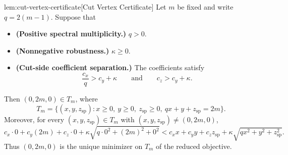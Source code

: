 \documentclass[11pt]{article}
\begin{document}
\begin{lemmav}{lem:cut-vertex-certificate}[Cut Vertex Certificate]
Let \(m\) be fixed and write \(q=2(m-1)\). Suppose that
\begin{itemize}
\item \textbf{(Positive spectral multiplicity.)} \(q>0\).
\item \textbf{(Nonnegative robustness.)} \(\kappa\ge 0\).
\item \textbf{(Cut-side coefficient separation.)} The coefficients satisfy
\[
\frac{c_x}{q}>c_y+\kappa
\qquad\text{and}\qquad
c_z>c_y+\kappa .
\]
\end{itemize}
Then \((0,2m,0)\in T_m\), where
\[
T_m=\{(x,y,z_{\mathrm{sp}}): x\ge 0,\ y\ge 0,\ z_{\mathrm{sp}}\ge 0,\ qx+y+z_{\mathrm{sp}}=2m\}.
\]
Moreover, for every \((x,y,z_{\mathrm{sp}})\in T_m\) with
\((x,y,z_{\mathrm{sp}})\neq (0,2m,0)\),
\[
c_x\cdot 0+c_y(2m)+c_z\cdot 0
+\kappa\sqrt{q\cdot 0^2+(2m)^2+0^2}
<
c_xx+c_yy+c_zz_{\mathrm{sp}}
+\kappa\sqrt{qx^2+y^2+z_{\mathrm{sp}}^2}.
\]
Thus \((0,2m,0)\) is the unique minimizer on \(T_m\) of the reduced objective.
\end{lemmav}
\end{document}
